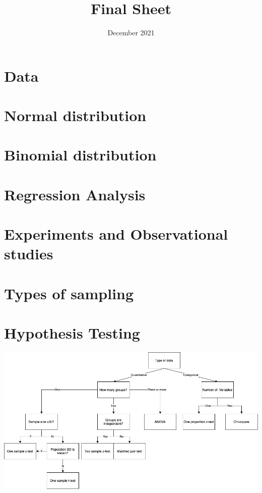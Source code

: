 \documentclass{article}
\title{Final Sheet}
\author{}
\date{December 2021}
\begin{document}
\maketitle

\section{Data}

\section{Normal distribution}

\section{Binomial distribution}

\section{Regression Analysis}

\section{Experiments and Observational studies}

\section{Types of sampling}
\section{Hypothesis Testing}
\includegraphics[scale = 0.5]{dec-tree.png}
\end{document}
